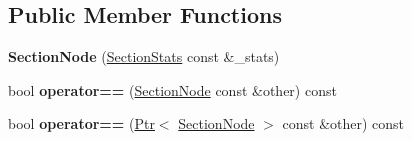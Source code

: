 \subsection*{Public Member Functions}
\begin{DoxyCompactItemize}
\item 
{\bfseries Section\+Node} (\hyperlink{structCatch_1_1SectionStats}{Section\+Stats} const \&\+\_\+stats)\hypertarget{structCatch_1_1CumulativeReporterBase_1_1SectionNode_adee3ee947f61300bc72266ee007cc1bd}{}\label{structCatch_1_1CumulativeReporterBase_1_1SectionNode_adee3ee947f61300bc72266ee007cc1bd}

\item 
bool {\bfseries operator==} (\hyperlink{structCatch_1_1CumulativeReporterBase_1_1SectionNode}{Section\+Node} const \&other) const \hypertarget{structCatch_1_1CumulativeReporterBase_1_1SectionNode_a4e852b8db8f2ca9da3f2306e6d1099f0}{}\label{structCatch_1_1CumulativeReporterBase_1_1SectionNode_a4e852b8db8f2ca9da3f2306e6d1099f0}

\item 
bool {\bfseries operator==} (\hyperlink{classCatch_1_1Ptr}{Ptr}$<$ \hyperlink{structCatch_1_1CumulativeReporterBase_1_1SectionNode}{Section\+Node} $>$ const \&other) const \hypertarget{structCatch_1_1CumulativeReporterBase_1_1SectionNode_a9e66ed9cd0cc7a124270d544340991c0}{}\label{structCatch_1_1CumulativeReporterBase_1_1SectionNode_a9e66ed9cd0cc7a124270d544340991c0}

\end{DoxyCompactItemize}
